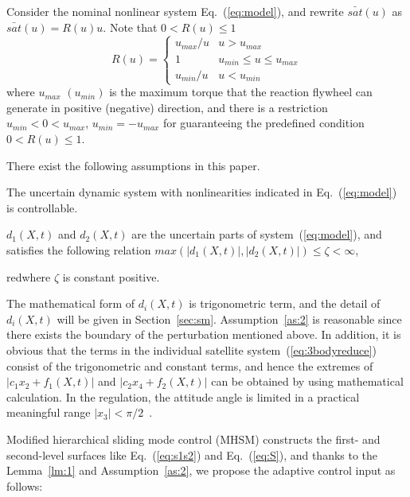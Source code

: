 Consider the nominal nonlinear system Eq.~(\ref{eq:model}), and rewrite $\bar{sat}(u)$ as $\bar{sat}(u) = R(u)u$. Note that $0 < R(u) \le 1$
\begin{equation}
R(u) =\begin{cases}
u_{max}/u   & u > u_{max}\\
1           & u_{min} \le u \le u_{max}\\
u_{min}/u   & u < u_{min}
\end{cases}
\end{equation}
where $u_{max}$ $(u_{min})$ is the maximum torque that the reaction flywheel can generate in positive (negative) direction, and there is a restriction $u_{min}<0<u_{max}$, $u_{min}=-u_{max}$ for guaranteeing the predefined condition $0<R(u)\le 1$.\par
There exist the following assumptions in this paper.
\begin{assumption}
The uncertain dynamic system with nonlinearities indicated in Eq.~(\ref{eq:model}) is controllable.\label{as:1}
\end{assumption}
\begin{assumption}
$d_1(X,t)$ and $d_2(X,t)$ are the uncertain parts of system~(\ref{eq:model}), and satisfies the following relation $max(\vert d_1(X,t)\vert,\vert d_2(X,t)\vert) \le \zeta <\infty$, \begin{color}{red}where $\zeta$ is constant positive.\end{color}\label{as:2}
\end{assumption}
\begin{remark}
The mathematical form of $d_i(X,t)$ is trigonometric term, and the detail of $d_i(X,t)$ will be given in Section~\ref{sec:sm}. Assumption~\ref{as:2} is reasonable since there exists the boundary of the perturbation mentioned above. In addition, it is obvious that the terms in the individual satellite system~(\ref{eq:3bodyreduce}) consist of the trigonometric and constant terms, and hence the extremes of $\vert c_1x_2+f_1(X,t)\vert$ and $\vert c_2x_4+f_2(X,t)\vert$ can be obtained by using mathematical calculation. In the regulation, the attitude angle is limited in a practical meaningful range $\vert x_3\vert<\pi/2$~\cite{chung2008propellant2}.
\end{remark}\par
Modified hierarchical sliding mode control (MHSM) constructs the first- and second-level surfaces like Eq.~(\ref{eq:s1s2}) and Eq.~(\ref{eq:S}), and thanks to the Lemma~\ref{lm:1} and Assumption~\ref{as:2}, we propose the adaptive control input as follows:
